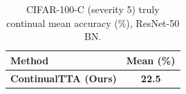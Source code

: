 \begin{table}[t]
\centering
\caption{CIFAR-100-C (severity 5) truly continual mean accuracy (\%), ResNet-50 BN.}
\label{tab:cifar100_continual}
\begin{tabular}{lc}
\toprule
Method & Mean (\%) \\
\midrule
\textbf{ContinualTTA (Ours)} & \textbf{22.5} \\
\bottomrule
\end{tabular}
\end{table}